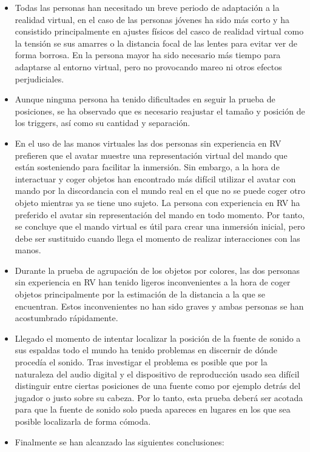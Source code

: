 \begin{itemize}
\item{Todas las personas han necesitado un breve periodo de adaptación a la realidad virtual, en el caso de las personas jóvenes ha sido más corto y ha consistido principalmente en ajustes físicos del casco de realidad virtual como la tensión se sus amarres o la distancia focal de las lentes para evitar ver de forma borrosa. En la persona mayor ha sido necesario más tiempo para adaptarse al entorno virtual, pero no provocando mareo ni otros efectos perjudiciales.}
\item{Aunque ninguna persona ha tenido dificultades en seguir la prueba de posiciones, se ha observado que es necesario reajustar el tamaño y posición de los triggers, así como su cantidad y separación.}
\item{En el uso de las manos virtuales las dos personas sin experiencia en RV prefieren que el avatar muestre una representación virtual del mando que están sosteniendo para facilitar la inmersión. Sin embargo, a la hora de interactuar y coger objetos han encontrado más difícil utilizar el avatar con mando por la discordancia con el mundo real en el que no se puede coger otro objeto mientras ya se tiene uno sujeto. La persona con experiencia en RV ha preferido el avatar sin representación del mando en todo momento. Por tanto, se concluye que el mando virtual es útil para crear una inmersión inicial, pero debe ser sustituido cuando llega el momento de realizar interacciones con las manos.}
\item{Durante la prueba de agrupación de los objetos por colores, las dos personas sin experiencia en RV han tenido ligeros inconvenientes a la hora de coger objetos principalmente por la estimación de la distancia a la que se encuentran. Estos inconvenientes no han sido graves y ambas personas se han acostumbrado rápidamente.}
\item{Llegado el momento de intentar localizar la posición de la fuente de sonido a sus espaldas todo el mundo ha tenido problemas en discernir de dónde procedía el sonido. Tras investigar el problema es posible que por la naturaleza del audio digital y el dispositivo de reproducción usado sea difícil distinguir entre ciertas posiciones de una fuente como por ejemplo detrás del jugador o justo sobre su cabeza. Por lo tanto, esta prueba deberá ser acotada para que la fuente de sonido solo pueda apareces en lugares en los que sea posible localizarla de forma cómoda.}
\item{Finalmente se han alcanzado las siguientes conclusiones:
    \begin{itemize}


\end{itemize}}
\end{itemize}
